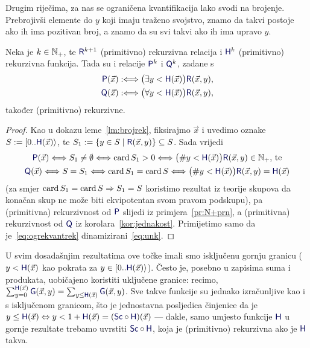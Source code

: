 Drugim riječima, za nas se ograničena kvantifikacija lako svodi na brojenje. Prebrojivši elemente do $y$ koji imaju traženo svojstvo, znamo da takvi postoje ako ih ima pozitivan broj, a znamo da su svi takvi ako ih ima upravo $y$.

\begin{propozicija}\label{prop:okvantrek}
Neka je $k\in{\mathbb N}_+$, te $\f R^{k+1}$ (primitivno) rekurzivna relacija i $\f H^k$ (primitivno) rekurzivna funkcija. Tada su i relacije $\f P^k$ i $\f Q^k$, zadane s
\begin{align}
    \f P(\vec x):\Longleftrightarrow\bigl(\exists y<\f H(\vec x)\bigr)\f R(\vec x,y)\text,\\
    \f Q(\vec x):\Longleftrightarrow\bigl(\forall y<\f H(\vec x)\bigr)\f R(\vec x,y)\text,
\end{align}
također (primitivno) rekurzivne.
\end{propozicija}
\begin{proof}
    Kao u dokazu leme~\ref{lm:brojrek}, fiksirajmo $\vec x$ i uvedimo oznake $S:=[0..\f H(\vec x)\rangle$, te $S_1:=\{y\in S\mid\f R(\vec x,y)\}\subseteq S$. Sada vrijedi
    \begin{gather}
    \label{eq:ogrekvantrek}
        \f P(\vec x)\Longleftrightarrow S_1\not=\emptyset\Longleftrightarrow\card S_1>0\Longleftrightarrow\bigl(\#y<\f H(\vec x)\bigr)\f R(\vec x,y)\in\N_+\text{, te}\\
        \f Q(\vec x)\Longleftrightarrow S=S_1\Longleftrightarrow\card S_1=\card S\Longleftrightarrow\bigl(\#y<\f H(\vec x)\bigr)\f R(\vec x,y)=\f H(\vec x)
    \end{gather}
    (za smjer $\operatorname{card} S_1=\operatorname{card} S\Rightarrow S_1=S$ koristimo rezultat iz teorije skupova da konačan skup ne može biti ekvipotentan svom pravom podskupu), pa (primitivna) rekurzivnost od $\f P$ slijedi iz primjera~\ref{pr:N+prn}, a (primitivna) rekurzivnost od $\f Q$ iz korolara~\ref{kor:jednakost}. Primijetimo samo da je~\eqref{eq:ogrekvantrek} dinamizirani~\eqref{eq:unk}.
\end{proof}

\begin{napomena}\label{nap:kvantSc}
U svim dosadašnjim rezultatima ove točke imali smo isključenu gornju granicu ($y<\f H(\vec x)$ kao pokrata za $y\in[0..\f H(\vec x)\rangle$). Često je, posebno u zapisima suma i produkata, uobičajeno koristiti uključene granice: recimo, $\sum_{y=0}^{\f H(\vec x)}\f G(\vec x,y)=\sum_{y\le\f H(\vec x)}\f G(\vec x,y)$. Sve takve funkcije su jednako izračunljive kao i s isključenom granicom, što je jednostavna posljedica činjenice da je $y\le\f H(\vec x)\Leftrightarrow y<1+\f H(\vec x)=(\f{Sc}\circ\f H)(\vec x)$ --- dakle, samo umjesto funkcije $\f H$ u gornje rezultate trebamo uvrstiti $\f{Sc}\circ\f H$, koja je (primitivno) rekurzivna ako je $\f H$ takva.
%
\end{napomena}


